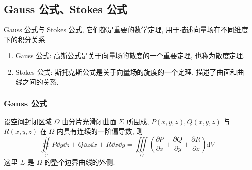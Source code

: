 % 
%     

\subsection{Gauss 公式、Stokes 公式}

Gauss 公式与 Stokes 公式, 它们都是重要的数学定理, 用于描述向量场在不同维度下的积分关系.
\begin{enumerate}
    \item Gauss 公式: 高斯公式是关于向量场的散度的一个重要定理, 也称为散度定理.
    \item Stokes 公式: 斯托克斯公式是关于向量场的旋度的一个定理, 描述了曲面和曲线之间的关系.
\end{enumerate}

\subsubsection{Gauss 公式}

\begin{theorem}[Gauss 公式]
    设空间封闭区域 $ \Omega $ 由分片光滑闭曲面 $ \Sigma $ 所围成, $  P(x, y, z), Q(x, y, z) $ 与 \\$ R(x, y, z) $ 在 $ \Omega $ 内具有连续的一阶偏导数, 则
    $$\oiint\limits_{\Sigma} P \dd  y \dd  z+Q \dd  z \dd  x+R \dd  x \dd  y =\iiint\limits_{\Omega}\left(\frac{\partial P}{\partial x}+\frac{\partial Q}{\partial y}+\frac{\partial R}{\partial z}\right) \mathrm{d} V$$
    这里 $ \Sigma $ 是 $ \Omega $ 的整个边界曲线的外侧.
\end{theorem}

